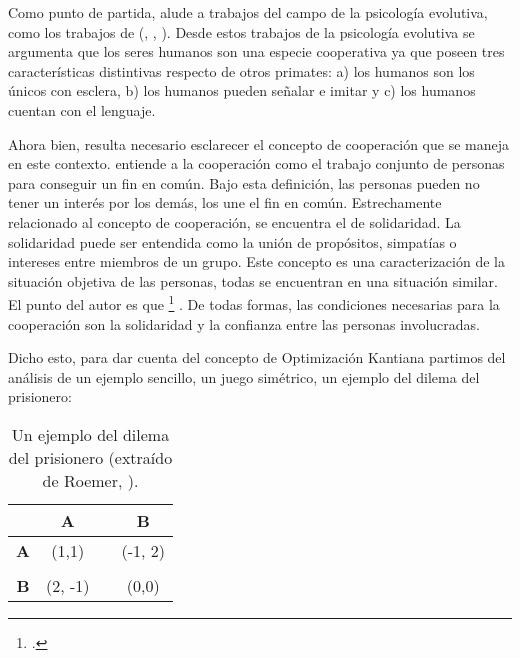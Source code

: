 Como punto de partida, \citet{Roemer_2019} alude a trabajos del campo de la psicología evolutiva, como los trabajos de \citeauthor{Tomasello_2014a} (\citeyear{Tomasello_2014a}, \citeyear{Tomasello_2014b}, \citeyear{Tomasello_2016}). Desde estos trabajos de la psicología evolutiva se argumenta que los seres humanos son una especie cooperativa ya que poseen tres características distintivas respecto de otros primates: a) los humanos son los únicos con esclera, b) los humanos pueden señalar e imitar y c) los humanos cuentan con el lenguaje.

Ahora bien, resulta necesario esclarecer el concepto de cooperación que se maneja en este contexto. \citet{Roemer_2019} entiende a la cooperación como el trabajo conjunto de personas para conseguir un fin en común. Bajo esta definición, las personas pueden no tener un interés por los demás, los une el fin en común. Estrechamente relacionado al concepto de cooperación, se encuentra el de solidaridad. La solidaridad puede ser entendida como la unión de propósitos, simpatías o intereses entre miembros de un grupo. Este concepto es una caracterización de la situación objetiva de las personas, todas se encuentran en una situación similar. El punto del autor es que \footnote{ \citep[p. 5]{Roemer_2019}.} \citep[p. 5]{Roemer_2019}. De todas formas, las condiciones necesarias para la cooperación son la solidaridad y la confianza entre las personas involucradas.

Dicho esto, para dar cuenta del concepto de Optimización Kantiana partimos del análisis de un ejemplo sencillo, un juego simétrico, un ejemplo del dilema del prisionero:


\vspace{3mm}
\begin{table}[H]
\caption{Un ejemplo del dilema del prisionero (extraído de Roemer, \citeyear{Roemer_2019}).}
\centering
\begin{tabular}{cccc}
\hline
           & \textbf{A} & \textbf{} & \textbf{B} \\ \hline
\textbf{A} & (1,1)      &           & (-1, 2)    \\
\textbf{}  &            &           &            \\
\textbf{B} & (2, -1)    &           & (0,0)      \\ \hline
\end{tabular}
\end{table}
\vspace{3mm}


